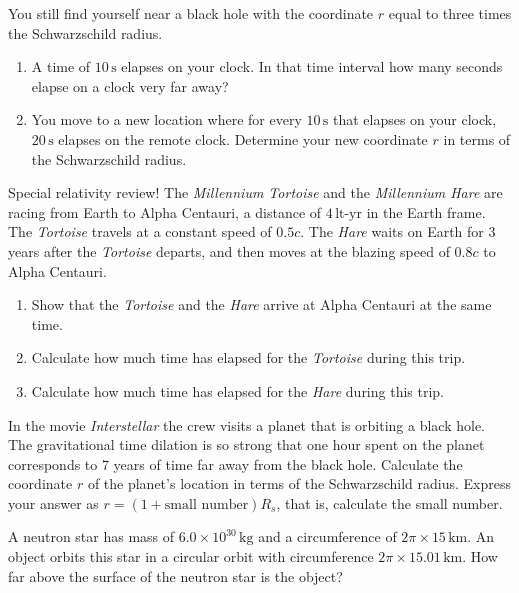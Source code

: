 \begin{exercise}
You still find yourself near a black hole with the coordinate $r$ equal
to three times the Schwarzschild radius.
\begin{enumerate}
  \item A time of $10\,\text{s}$ elapses on your clock.  In that time
    interval how many seconds elapse on a clock very far away?
\item You move to a new location where for every $10\,\text{s}$ that
  elapses on your clock, $20\,\text{s}$ elapses on the remote clock.
  Determine your new coordinate $r$ in terms of the Schwarzschild
  radius.
\end{enumerate}
\label{prob:Schwarzschild_time}
\end{exercise}

\begin{exercise}
Special relativity review!  The \textit{Millennium Tortoise} and the
\textit{Millennium Hare} are racing from Earth to Alpha Centauri, a
distance of $4\,\text{lt-yr}$ in the Earth frame.  The
\textit{Tortoise} travels at a constant speed of $0.5c$.  The
\textit{Hare} waits on Earth for 3 years after the \textit{Tortoise}
departs, and then moves at the blazing speed of $0.8c$ to Alpha Centauri.
\begin{enumerate}
 \item Show that the \textit{Tortoise} and the \textit{Hare} arrive at
   Alpha Centauri at the same time.
\item Calculate how much time has elapsed for the \textit{Tortoise}
  during this trip.
\item Calculate how much time has elapsed for the \textit{Hare} during
  this trip.
\end{enumerate}
\label{prob:Hare_and_Tortoise}
\end{exercise}

\begin{exercise}
  In the movie \textit{Interstellar} the crew visits a planet that is
  orbiting a black hole.  The gravitational time dilation is so
  strong that one hour spent on the planet corresponds to 7 years of
  time far away from the black hole.  Calculate the coordinate $r$ of
  the planet's location in terms of the Schwarzschild radius.  Express
  your answer as $r=(1 + \text{small number})R_s$, that is, calculate
  the small number.
\end{exercise}

\begin{exercise}
  A neutron star has mass of $6.0\times 10^{30}\,\text{kg}$ and a
  circumference of $2\pi\times 15\,\text{km}$.  An object orbits this
star in a circular orbit with circumference $2\pi\times
  15.01\,\text{km}$.  How far above the surface of the neutron star
is the object?
\end{exercise}




